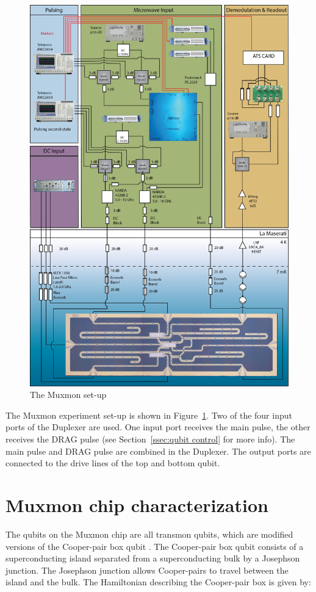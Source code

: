       \begin{figure}[tb]
        \centering
        \includegraphics[width=.9\textwidth]{../Figures/20150512_Muxmon_Setup.jpg}
        \caption{The Muxmon set-up}
        \label{fig:Muxmon set-up}
      \end{figure}

      The Muxmon experiment set-up is shown in Figure~\ref{fig:Muxmon set-up}. Two of the four input ports of the Duplexer are used. One input port receives the main pulse, the other receives the DRAG pulse (see Section~\ref{ssec:qubit control} for more info). The main pulse and DRAG pulse are combined in the Duplexer. The output ports are connected to the drive lines of the top and bottom qubit.

  \chapter{Muxmon chip characterization}
    \label{ch:Muxmon chip characterization}
    The qubits on the Muxmon chip are all transmon qubits, which are modified versions of the Cooper-pair box qubit \cite{bouchiat1998CooperPairBox}. The Cooper-pair box qubit consists of a superconducting island separated from a superconducting bulk by a Josephson junction. The Josephson junction allows Cooper-pairs to travel between the island and the bulk. The Hamiltonian describing the Cooper-pair box is given by:

